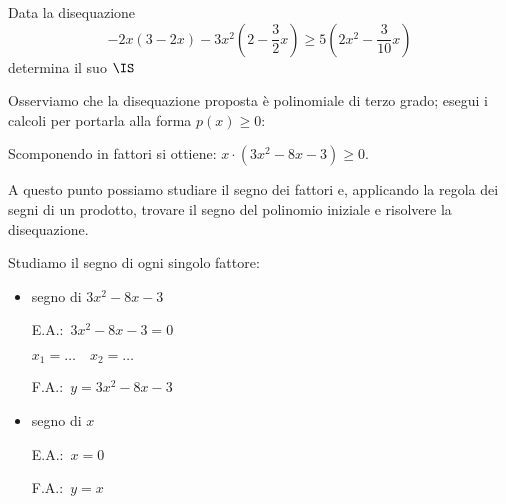 \begin{esempio}
Data la disequazione 
\[-2x(3-2x)-3x^2\left(2-\dfrac{3}{2}x\right) \ge 
  5\left(2x^2-\dfrac{3}{10}x\right)\] 
determina il suo \(\IS\)

Osserviamo che la disequazione proposta è polinomiale di terzo grado; 
esegui i calcoli per portarla alla forma \(p(x)\ge 0\): 
\vspace{3em}

Scomponendo in fattori si ottiene: \(x\cdot (3x^2-8x-3)\ge 0\). 

A questo punto possiamo studiare il segno dei fattori e, applicando la regola 
dei segni di un prodotto, trovare il segno del polinomio iniziale e risolvere 
la disequazione.

Studiamo il segno di ogni singolo fattore:
\begin{itemize}

 \item segno di \(3x^2-8x-3\)\\
 \begin{minipage}{.35\textwidth}
  E.A.:~\(3x^2-8x-3=0\)
  
  \(x_1=\dots \quad x_2=\dots\)
 \end{minipage}
 \begin{minipage}{.25\textwidth}
  F.A.:~\(y=3x^2-8x-3\)
 \end{minipage}
 \begin{minipage}{.38\textwidth}
  \begin{inaccessibleblock}
  \parabolaamadma{}{}
\end{inaccessibleblock}
 \end{minipage}
 
 \item  segno di \(x\)\\
 \begin{minipage}{.35\textwidth}
  E.A.:~\(x=0\)
  \vspace{1.8em}
 \end{minipage}
 \begin{minipage}{.25\textwidth}
  F.A.:~\(y=x\)
  \vspace{1.8em}
 \end{minipage}
 \begin{minipage}{.38\textwidth}
  \begin{inaccessibleblock}
\end{inaccessibleblock}
 \end{minipage}
 

\end{itemize}
\end{esempio}

